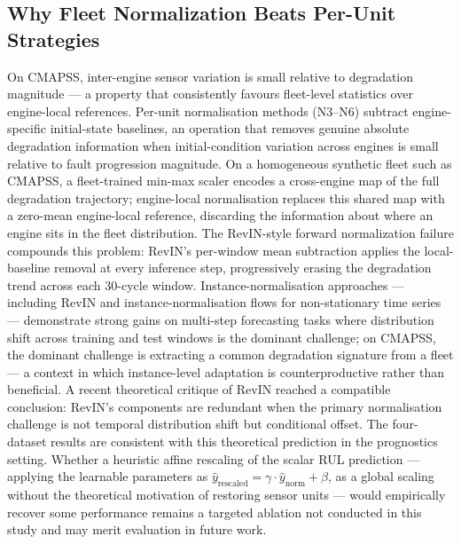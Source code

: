 \documentclass[review,12pt]{elsarticle}
\begin{document}
\subsection{Why Fleet Normalization Beats Per-Unit Strategies}

On CMAPSS, inter-engine sensor variation is small relative to degradation magnitude --- a property that consistently favours fleet-level statistics over engine-local references. Per-unit normalisation methods (N3–N6) subtract engine-specific initial-state baselines, an operation that removes genuine absolute degradation information when initial-condition variation across engines is small relative to fault progression magnitude. On a homogeneous synthetic fleet such as CMAPSS, a fleet-trained min-max scaler encodes a cross-engine map of the full degradation trajectory; engine-local normalisation replaces this shared map with a zero-mean engine-local reference, discarding the information about where an engine sits in the fleet distribution. The RevIN-style forward normalization \cite{ref23} failure compounds this problem: RevIN's per-window mean subtraction applies the local-baseline removal at every inference step, progressively erasing the degradation trend across each 30-cycle window. Instance-normalisation approaches --- including RevIN \cite{ref23} and instance-normalisation flows for non-stationary time series \cite{ref28} --- demonstrate strong gains on multi-step forecasting tasks where distribution shift across training and test windows is the dominant challenge; on CMAPSS, the dominant challenge is extracting a common degradation signature from a fleet — a context in which instance-level adaptation is counterproductive rather than beneficial. A recent theoretical critique of RevIN \cite{ref25,ref26} reached a compatible conclusion: RevIN's components are redundant when the primary normalisation challenge is not temporal distribution shift but conditional offset. The four-dataset results are consistent with this theoretical prediction in the prognostics setting. Whether a heuristic affine rescaling of the scalar RUL prediction --- applying the learnable parameters as $\hat{y}_{\text{rescaled}} = \gamma \cdot \hat{y}_{\text{norm}} + \beta$, as a global scaling without the theoretical motivation of restoring sensor units --- would empirically recover some performance remains a targeted ablation not conducted in this study and may merit evaluation in future work.
\end{document}
